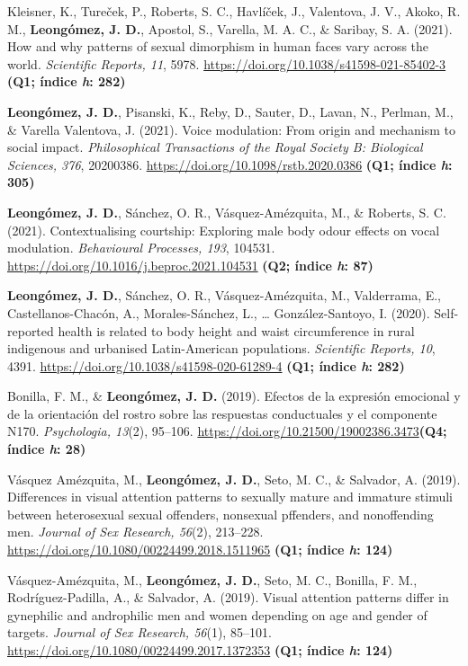\documentclass[11pt,a4paper,]{awesome-cv}
\begin{document}
Kleisner, K., Tureček, P., Roberts, S. C., Havlíček, J., Valentova, J.
V., Akoko, R. M., \textbf{Leongómez, J. D.}, Apostol, S., Varella, M. A.
C., \& Saribay, S. A. (2021). How and why patterns of sexual dimorphism
in human faces vary across the world. \emph{Scientific Reports, 11},
5978. \url{https://doi.org/10.1038/s41598-021-85402-3} \textbf{(Q1;
índice \emph{h}: 282)}

\textbf{Leongómez, J. D.}, Pisanski, K., Reby, D., Sauter, D., Lavan,
N., Perlman, M., \& Varella Valentova, J. (2021). Voice modulation: From
origin and mechanism to social impact. \emph{Philosophical Transactions
of the Royal Society B: Biological Sciences, 376}, 20200386.
\url{https://doi.org/10.1098/rstb.2020.0386} \textbf{(Q1; índice
\emph{h}: 305)}

\textbf{Leongómez, J. D.}, Sánchez, O. R., Vásquez-Amézquita, M., \&
Roberts, S. C. (2021). Contextualising courtship: Exploring male body
odour effects on vocal modulation. \emph{Behavioural Processes, 193},
104531. \url{https://doi.org/10.1016/j.beproc.2021.104531} \textbf{(Q2;
índice \emph{h}: 87)}

\textbf{Leongómez, J. D.}, Sánchez, O. R., Vásquez-Amézquita, M.,
Valderrama, E., Castellanos-Chacón, A., Morales-Sánchez, L., \ldots{}
González-Santoyo, I. (2020). Self-reported health is related to body
height and waist circumference in rural indigenous and urbanised
Latin-American populations. \emph{Scientific Reports, 10}, 4391.
\url{https://doi.org/10.1038/s41598-020-61289-4} \textbf{(Q1; índice
\emph{h}: 282)}

Bonilla, F. M., \& \textbf{Leongómez, J. D.} (2019). Efectos de la
expresión emocional y de la orientación del rostro sobre las respuestas
conductuales y el componente N170. \emph{Psychologia, 13}(2), 95--106.
\url{https://doi.org/10.21500/19002386.3473}\textbf{(Q4; índice
\emph{h}: 28)}

Vásquez Amézquita, M., \textbf{Leongómez, J. D.}, Seto, M. C., \&
Salvador, A. (2019). Differences in visual attention patterns to
sexually mature and immature stimuli between heterosexual sexual
offenders, nonsexual pffenders, and nonoffending men. \emph{Journal of
Sex Research, 56}(2), 213--228.
\url{https://doi.org/10.1080/00224499.2018.1511965} \textbf{(Q1; índice
\emph{h}: 124)}

Vásquez-Amézquita, M., \textbf{Leongómez, J. D.}, Seto, M. C., Bonilla,
F. M., Rodríguez-Padilla, A., \& Salvador, A. (2019). Visual attention
patterns differ in gynephilic and androphilic men and women depending on
age and gender of targets. \emph{Journal of Sex Research, 56}(1),
85--101. \url{https://doi.org/10.1080/00224499.2017.1372353}
\textbf{(Q1; índice \emph{h}: 124)}
\end{document}
